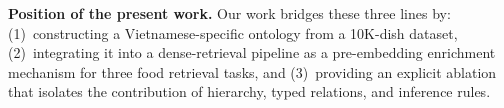 \textbf{Position of the present work.}
Our work bridges these three lines by: (1)~constructing a Vietnamese-specific ontology from a 10K-dish dataset, (2)~integrating it into a dense-retrieval pipeline as a pre-embedding enrichment mechanism for three food retrieval tasks, and (3)~providing an explicit ablation that isolates the contribution of hierarchy, typed relations, and inference rules.
